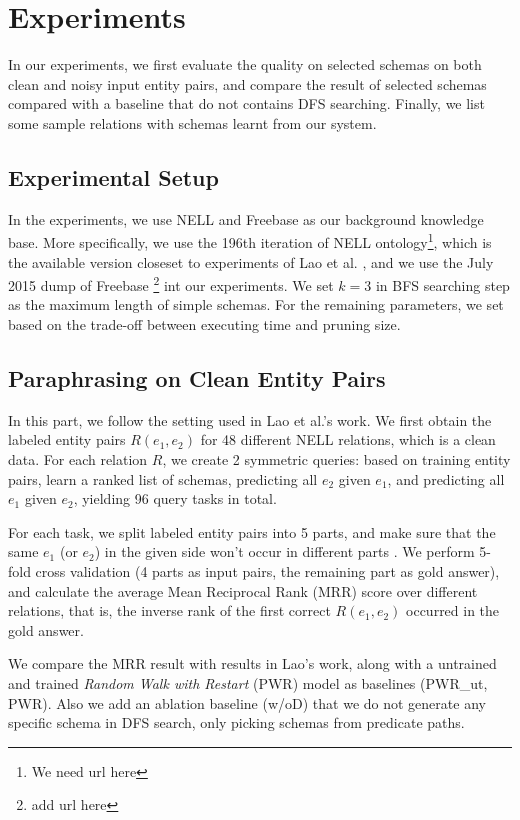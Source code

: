 \section{Experiments}

In our experiments, we first evaluate the quality on selected schemas on
both clean and noisy input entity pairs, and compare the result of selected 
schemas compared with a baseline that do not contains DFS searching.
Finally, we list some sample relations with schemas learnt from our system.

\subsection{Experimental Setup}
In the experiments, we use NELL and Freebase as our background knowledge base.
More specifically, we use the 196th iteration of NELL ontology\footnote{We need url here}, 
which is the available version closeset to experiments of Lao et al. 
\cite{lao2011random}, and we use the July 2015 dump of Freebase 
\footnote{add url here} int our experiments.
We set $k = 3$ in BFS searching step as the maximum length of simple schemas.
For the remaining parameters, we set  based on the trade-off
between executing time and pruning size.

\subsection{Paraphrasing on Clean Entity Pairs}
In this part, we follow the setting used in Lao et al.'s work. We first obtain the labeled
entity pairs $R(e_1, e_2)$ for 48 different NELL relations, which is a clean data.
For each relation $R$, we create 2 symmetric queries: based on training entity pairs, 
learn a ranked list of schemas, predicting all $e_2$ given $e_1$, and predicting all 
$e_1$ given $e_2$, yielding 96 query tasks in total. 

For each task, we split labeled entity pairs into 5 parts, and make sure that 
the same $e_1$ (or $e_2$) in the given side won't occur in different parts .
We perform 5-fold cross validation (4 parts as input pairs, the remaining part as gold answer),
and calculate the average Mean Reciprocal Rank (MRR) score over different relations, that is, 
the inverse rank of the first correct $R(e_1, e_2)$ occurred in the gold answer.

We compare the MRR result with results in Lao's work, along with a untrained and trained
\textit{Random Walk with Restart} (PWR) model \cite{Haveliwala2002topic} as baselines (PWR\_ut, PWR).
Also we add an ablation baseline (w/oD) that we do not generate any specific schema in
DFS search, only picking schemas from predicate paths.

